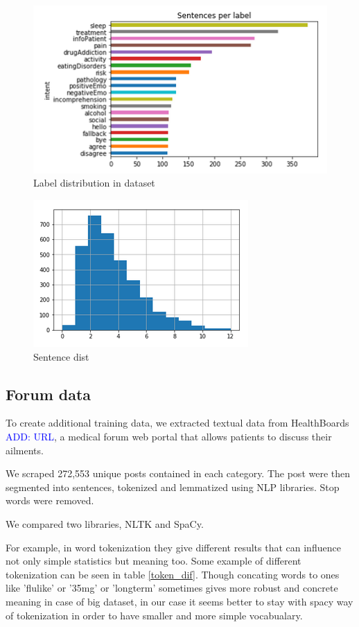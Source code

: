 \documentclass[11pt]{article}
\newcommand\add[1]{{\textcolor{blue}{ADD: #1}}}
\begin{document}
 \begin{figure}[h]
 	\centering
 	\includegraphics[scale=0.5]{report1.png}
	\caption{Label distribution in dataset}
 \label{figure:name}
 \end{figure}




 \begin{figure}[h]
 	\centering
 	\includegraphics[scale=0.4]{report4.png}
	\caption{Sentence dist}
 \label{words_freq}
 \end{figure}



\subsection{Forum data}

To create additional training data, we extracted textual data from
HealthBoards \add{URL}, a medical forum web portal that allows
patients to discuss their ailments.

We scraped 272,553 unique posts contained in each category.  The post
were then segmented into sentences, tokenized and lemmatized using NLP
libraries. Stop words were removed.

We compared two libraries, NLTK and SpaCy.

For example, in word tokenization they give different results that can influence not only simple statistics but meaning too. Some example of different tokenization can be seen in table \ref{token_dif}. Though concating words to ones like 'flulike' or '35mg' or 'longterm' sometimes gives more robust and concrete meaning in case of big dataset, in our case it seems better to stay with spacy way of tokenization in order to have smaller and more simple vocabualary.
\end{document}
